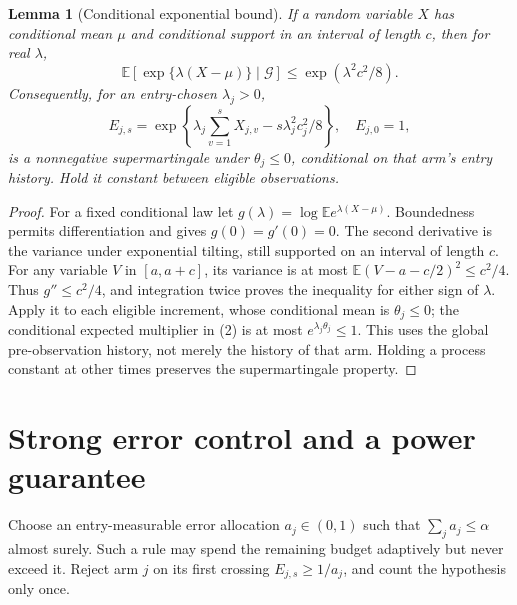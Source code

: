 \documentclass[11pt]{article}
\newtheorem{lemma}[theorem]{Lemma}
\theoremstyle{remark}
\newcommand{\E}{\mathbb E}
\begin{document}
\begin{lemma}[Conditional exponential bound]
If a random variable $X$ has conditional mean $\mu$ and conditional
support in an interval of length $c$, then for real $\lambda$,
\[
 \E[\exp\{\lambda(X-\mu)\}\mid\mathcal G]
 \leq\exp(\lambda^2c^2/8).
\]
Consequently, for an entry-chosen $\lambda_j>0$,
\[
 E_{j,s}=\exp\left\{\lambda_j\sum_{v=1}^s X_{j,v}
                    -s\lambda_j^2c_j^2/8\right\},\quad E_{j,0}=1,
 \tag{2}
\]
is a nonnegative supermartingale under $\theta_j\leq0$, conditional
on that arm's entry history. Hold it constant between eligible observations.
\end{lemma}
\begin{proof}
For a fixed conditional law let $g(\lambda)=\log\E e^{\lambda(X-\mu)}$.
Boundedness permits differentiation and gives $g(0)=g'(0)=0$.
The second derivative is the variance under exponential tilting, still
supported on an interval of length $c$. For any variable $V$ in
$[a,a+c]$, its variance is at most
$\E(V-a-c/2)^2\leq c^2/4$. Thus $g''\leq c^2/4$, and integration
twice proves the inequality for either sign of $\lambda$.
Apply it to each eligible increment, whose conditional mean is
$\theta_j\leq0$; the conditional expected multiplier in (2) is at
most $e^{\lambda_j\theta_j}\leq1$. This uses the global pre-observation
history, not merely the history of that arm. Holding a process constant
at other times preserves the supermartingale property.
\end{proof}

\section{Strong error control and a power guarantee}
Choose an entry-measurable error allocation $a_j\in(0,1)$ such that
$\sum_j a_j\leq\alpha$ almost surely. Such a rule may spend the remaining
budget adaptively but never exceed it. Reject arm $j$ on its first crossing
$E_{j,s}\geq1/a_j$, and count the hypothesis only once.
\end{document}
